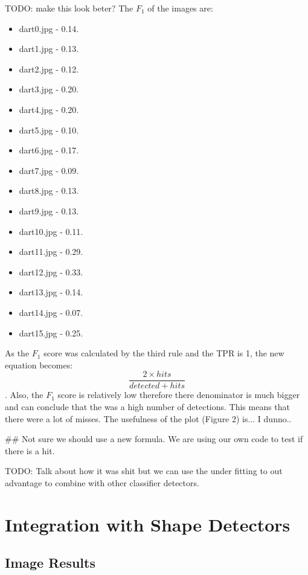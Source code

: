 \documentclass[a4paper]{article}
\begin{document}
TODO: make this look beter?
The \(F_{1}\) of the images are:
\begin{multicols}{4}
    \begin{itemize}
		\item dart0.jpg - 0.14.
        \item dart1.jpg - 0.13.
        \item dart2.jpg - 0.12.
        \item dart3.jpg - 0.20.
        \item dart4.jpg - 0.20.
        \item dart5.jpg - 0.10.
        \item dart6.jpg - 0.17.
        \item dart7.jpg - 0.09.
        \item dart8.jpg - 0.13.
        \item dart9.jpg - 0.13.
        \item dart10.jpg - 0.11.
        \item dart11.jpg - 0.29.
        \item dart12.jpg - 0.33.
        \item dart13.jpg - 0.14.
        \item dart14.jpg - 0.07.
        \item dart15.jpg - 0.25.
    \end{itemize}
\end{multicols}

As the \(F_{1}\) score was calculated by the third rule and the TPR is 1, the
new equation becomes: \[\frac{2 \times hits}{detected + hits}\]. Also, the
\(F_{1}\) score is relatively low therefore there denominator is much bigger
and can conclude that the was a high number of detections. This means that
there were a lot of misses. The usefulness of the plot (Figure 2) is... I
dunno..

## Not sure we should use a new formula. We are using our own code to test if
there is a hit.

TODO: Talk about how it was shit but we can use the under fitting to out
advantage to combine with other classifier detectors.

\section*{Integration with Shape Detectors}
\subsection*{Image Results}
\vspace{-0.7em}
\end{document}
